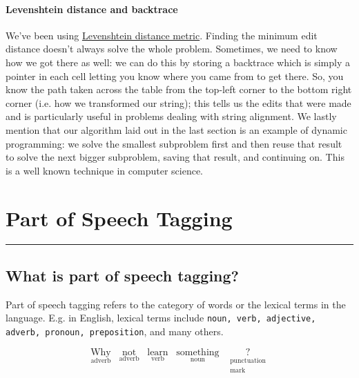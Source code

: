 \documentclass[12pt]{article}
\begin{document}
\paragraph{Levenshtein distance and backtrace} We've been using \href{https://en.wikipedia.org/wiki/Levenshtein_distance#Definition}{Levenshtein distance metric}. Finding the minimum edit distance doesn't always solve the whole problem. Sometimes, we need to know how we got there as well: we can do this by storing a backtrace which is simply a pointer in each cell letting you know where you came from to get there. So, you know the path taken across the table from the top-left corner to the bottom right corner (i.e. how we transformed our string); this tells us the edits that were made and is particularly useful in problems dealing with string alignment. We lastly mention that our algorithm laid out in the last section is an example of dynamic programming: we solve the smallest subproblem first and then reuse that result to solve the next bigger subproblem, saving that result, and continuing on. This is a well known technique in computer science.

\section{Part of Speech Tagging}\vspace{.1pt} \hrule height 2pt \smallskip \renewcommand{\arraystretch}{1}%
\subsection{What is part of speech tagging?} Part of speech tagging refers to the category of words or the lexical terms in the language. E.g. in English, lexical terms include \texttt{noun, verb, adjective, adverb, pronoun, preposition}, and many others.

\begin{equation*}
\underset{\textrm{adverb}}{\textrm{Why}} \hspace{10pt}             \underset{\textrm{adverb}}{\textrm{not}} \hspace{10pt}
\underset{\textrm{verb}}{\textrm{learn}} \hspace{10pt}
\underset{\textrm{noun}}{\textrm{something}} \hspace{10pt}         
\underset{\substack{\textrm{punctuation} \\ \textrm{mark}}}{\textrm{?}}
\end{equation*}
\end{document}
